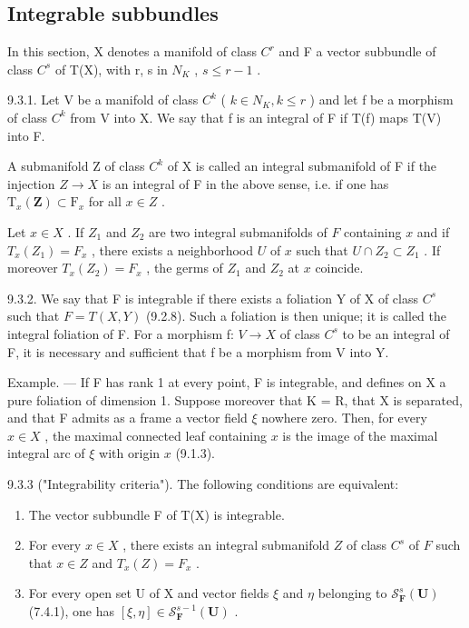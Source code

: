 \subsection{Integrable subbundles}

In this section, X denotes a manifold of class \(C^{r}\) and F a vector subbundle of class \(C^{s}\) of T(X), with r, s in \(N_{K}\) , \(s \leqslant r - 1\) .

9.3.1. Let V be a manifold of class \(C^{k}\) ( \(k \in N_{K}, k \leqslant r\) ) and let f be a morphism of class \(C^{k}\) from V into X. We say that f is an integral of F if T(f) maps T(V) into F.

A submanifold Z of class \(C^{k}\) of X is called an integral submanifold of F if the injection \(Z \rightarrow X\) is an integral of F in the above sense, i.e. if one has \(\mathrm{T}_{x}(\mathbf{Z}) \subset \mathrm{F}_{x}\) for all \(x \in Z\) .

Let \(x \in X\) . If \(Z_1\) and \(Z_2\) are two integral submanifolds of \(F\) containing \(x\) and if \(T_x(Z_1) = F_x\) , there exists a neighborhood \(U\) of \(x\) such that \(U \cap Z_2 \subset Z_1\) . If moreover \(T_x(Z_2) = F_x\) , the germs of \(Z_1\) and \(Z_2\) at \(x\) coincide.

9.3.2. We say that F is integrable if there exists a foliation Y of X of class \(C^{s}\) such that \(F = T(X, Y)\) (9.2.8). Such a foliation is then unique; it is called the integral foliation of F. For a morphism f: \(V \to X\) of class \(C^{s}\) to be an integral of F, it is necessary and sufficient that f be a morphism from V into Y.

Example. --- If F has rank 1 at every point, F is integrable, and defines on X a pure foliation of dimension 1. Suppose moreover that K = R, that X is separated, and that F admits as a frame a vector field \(\xi\) nowhere zero. Then, for every \(x \in X\) , the maximal connected leaf containing \(x\) is the image of the maximal integral arc of \(\xi\) with origin \(x\) (9.1.3).

9.3.3 ("Integrability criteria"). The following conditions are equivalent:

\begin{enumerate}
\def\labelenumi{(\roman{enumi})}
\item
  The vector subbundle F of T(X) is integrable.
\item
  For every \(x \in X\) , there exists an integral submanifold \(Z\) of class \(C^s\) of \(F\) such that \(x \in Z\) and \(T_x(Z) = F_x\) .
\item
  For every open set U of X and vector fields \(\xi\) and \(\eta\) belonging to \(\mathcal{S}_{\mathbf{F}}^{s}(\mathbf{U})\) (7.4.1), one has \([\xi, \eta] \in \mathcal{S}_{\mathbf{F}}^{s-1}(\mathbf{U})\) .
\end{enumerate}

